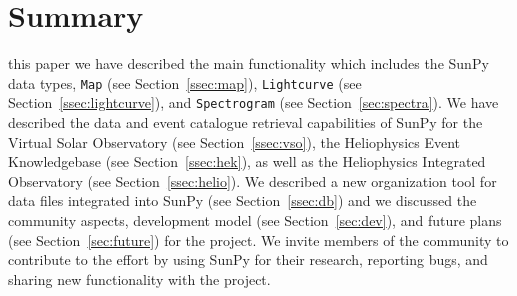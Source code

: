 \section{Summary}
this paper we have described the main functionality which includes the SunPy data types, 
\texttt{Map} (see Section~\ref{ssec:map}), \texttt{Lightcurve} (see Section~\ref{ssec:lightcurve}), and \texttt{Spectrogram} (see Section~\ref{sec:spectra}).
We have described the data and event catalogue retrieval capabilities of SunPy for
the Virtual Solar Observatory (see Section~\ref{ssec:vso}), the Heliophysics Event Knowledgebase (see Section~\ref{ssec:hek}), as well as
the Heliophysics Integrated Observatory (see Section~\ref{ssec:helio}). We described
a new organization tool for data files integrated into SunPy (see Section~\ref{ssec:db}) 
and we discussed the community aspects, development model (see Section~\ref{sec:dev}), and future plans (see Section~\ref{sec:future}) for the project.
We invite members of the community to contribute to the effort by using SunPy for their 
research, reporting bugs, and sharing new functionality with the project.